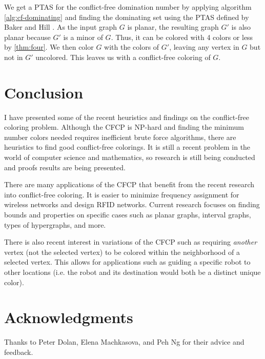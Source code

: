 \documentclass{sig-alternate}
\begin{document}
We get a PTAS for the conflict-free domination number by applying algorithm \ref{alg:cf-dominating} and finding the dominating set using the PTAS defined by Baker and Hill \cite{baker1994approximation}. As the input graph $G$ is planar, the resulting graph $G'$ is also planar because $G'$ is a minor of $G$. Thus, it can be colored with 4 colors or less by \ref{thm:four}. We then color $G$ with the colors of $G'$, leaving any vertex in $G$ but not in $G'$ uncolored. This leaves us with a conflict-free coloring of $G$.



\section{Conclusion}
\label{sec:conclusion}
I have presented some of the recent heuristics and findings on the conflict-free coloring problem. Although the CFCP is NP-hard and finding the minimum number colors needed requires inefficient brute force algorithms, there are heuristics to find good conflict-free colorings. It is still a recent problem in the world of computer science and mathematics, so research is still being conducted and proofs results are being presented.

There are many applications of the CFCP that benefit from the recent research into conflict-free coloring. It is easier to minimize frequency assignment for wireless networks and design RFID networks. Current research focuses on finding bounds and properties on specific cases such as planar graphs, interval graphs, types of hypergraphs, and more.

There is also recent interest in variations of the CFCP such as requiring \emph{another} vertex (not the selected vertex) to be colored within the neighborhood of a selected vertex. This allows for applications such as guiding a specific robot to other locations (i.e. the robot and its destination would both be a distinct unique color).

\section{Acknowledgments}
Thanks to Peter Dolan, Elena Machkasova, and Peh Ng for their advice and feedback.



\end{document}
